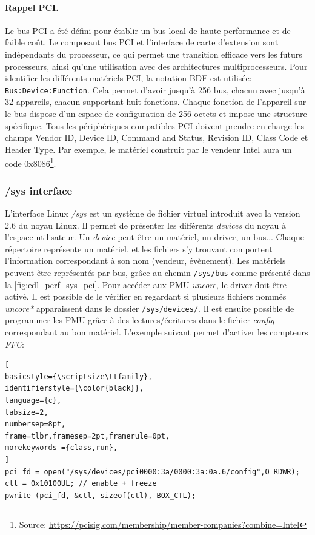         \paragraph{Rappel PCI.} 
        Le bus PCI a été défini pour établir un bus local de haute performance et de faible coût. Le composant bus PCI et l'interface de carte d'extension sont indépendants du processeur, ce qui permet une transition efficace vers les futurs processeurs, ainsi qu'une utilisation avec des architectures multiprocesseurs. Pour identifier les différents matériels PCI, la notation BDF est utilisée: \verb| Bus:Device:Function|. Cela permet d'avoir jusqu'à 256 bus, chacun avec jusqu'à 32 appareils, chacun supportant huit fonctions. Chaque fonction de l'appareil sur le bus dispose d'un espace de configuration de 256 octets et impose une structure spécifique. Tous les périphériques compatibles PCI doivent prendre en charge les champs Vendor ID, Device ID, Command and Status, Revision ID, Class Code et Header Type. Par exemple, le matériel construit par le vendeur Intel aura un code 0x8086\footnote{Source: \url{https://pcisig.com/membership/member-companies?combine=Intel}}.
    
    

    \subsubsection{/sys interface}\label{annexe:hc_sys}
        L'interface Linux \textit{/sys} est un système de fichier virtuel introduit avec la version 2.6 du noyau Linux. Il permet de présenter les différents \textit{devices} du noyau à l'espace utilisateur. Un \textit{device} peut être un matériel, un driver, un bus... Chaque répertoire représente un matériel, et les fichiers s'y trouvant comportent l'information correspondant à son nom (vendeur, évènement). Les matériels peuvent être représentés par bus, grâce au chemin \verb|/sys/bus| comme présenté dans la \autoref{fig:edl_perf_sys_pci}. Pour accéder aux PMU \textit{uncore}, le driver doit être activé. Il est possible de le vérifier en regardant si plusieurs fichiers nommés \textit{uncore*} apparaissent dans le dossier \verb|/sys/devices/|. Il est ensuite possible de programmer les PMU grâce à des lectures/écritures dans le fichier \textit{config} correspondant au bon matériel. L'exemple suivant permet d'activer les compteurs \textit{FFC}:
   
    
\begin{lstlisting}[
basicstyle={\scriptsize\ttfamily},
identifierstyle={\color{black}},
language={c},
tabsize=2,
numbersep=8pt,
frame=tlbr,framesep=2pt,framerule=0pt,
morekeywords ={class,run},
]
pci_fd = open("/sys/devices/pci0000:3a/0000:3a:0a.6/config",O_RDWR);
ctl = 0x10100UL; // enable + freeze
pwrite (pci_fd, &ctl, sizeof(ctl), BOX_CTL);
\end{lstlisting}

